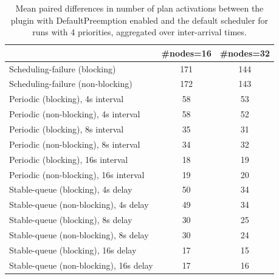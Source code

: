 \begin{table}[t]
\tiny
\setlength{\tabcolsep}{1.2pt}
\renewcommand{\arraystretch}{1.12}
\centering
\caption{Mean paired differences in number of plan activations between the plugin with DefaultPreemption enabled and the default scheduler for runs with 4 priorities, aggregated over inter-arrival times.}
\label{tab:plan_activations-defpreempt1-prio4-std0-agg-arrival}
\begin{tabular}{l c c}
\toprule
 & \#nodes=16 & \#nodes=32 \\
\midrule
Scheduling-failure (blocking) & 171 & 144 \\
Scheduling-failure (non-blocking) & 172 & 143 \\
Periodic (blocking), 4s interval & 58 & 53 \\
Periodic (non-blocking), 4s interval & 58 & 52 \\
Periodic (blocking), 8s interval & 35 & 31 \\
Periodic (non-blocking), 8s interval & 34 & 32 \\
Periodic (blocking), 16s interval & 18 & 19 \\
Periodic (non-blocking), 16s interval & 19 & 20 \\
Stable-queue (blocking), 4s delay & 50 & 34 \\
Stable-queue (non-blocking), 4s delay & 49 & 34 \\
Stable-queue (blocking), 8s delay & 30 & 25 \\
Stable-queue (non-blocking), 8s delay & 30 & 24 \\
Stable-queue (blocking), 16s delay & 17 & 15 \\
Stable-queue (non-blocking), 16s delay & 17 & 16 \\
\bottomrule
\end{tabular}
\end{table}
